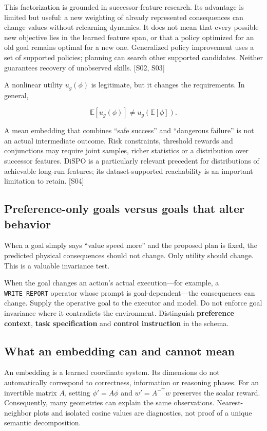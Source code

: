 \documentclass[
  11pt,
  a4paper,
]{article}
\begin{document}
This factorization is grounded in successor-feature research. Its
advantage is limited but useful: a new weighting of already represented
consequences can change values without relearning dynamics. It does not
mean that every possible new objective lies in the learned feature span,
or that a policy optimized for an old goal remains optimal for a new
one. Generalized policy improvement uses a set of supported policies;
planning can search other supported candidates. Neither guarantees
recovery of unobserved skills. {[}S02, S03{]}

A nonlinear utility \(u_g(\phi)\) is legitimate, but it changes the
requirements. In general,

\[
\mathbb{E}[u_g(\phi)]\ne u_g(\mathbb{E}[\phi]).
\]

A mean embedding that combines ``safe success'' and ``dangerous
failure'' is not an actual intermediate outcome. Risk constraints,
threshold rewards and conjunctions may require joint samples, richer
statistics or a distribution over successor features. DiSPO is a
particularly relevant precedent for distributions of achievable long-run
features; its dataset-supported reachability is an important limitation
to retain. {[}S04{]}

\subsection{Preference-only goals versus goals that alter
behavior}\label{preference-only-goals-versus-goals-that-alter-behavior}

When a goal simply says ``value speed more'' and the proposed plan is
fixed, the predicted physical consequences should not change. Only
utility should change. This is a valuable invariance test.

When the goal changes an action's actual execution---for example, a
\texttt{WRITE\_REPORT} operator whose prompt is goal-dependent---the
consequences can change. Supply the operative goal to the executor and
model. Do not enforce goal invariance where it contradicts the
environment. Distinguish \textbf{preference context}, \textbf{task
specification} and \textbf{control instruction} in the schema.

\subsection{What an embedding can and cannot
mean}\label{what-an-embedding-can-and-cannot-mean}

An embedding is a learned coordinate system. Its dimensions do not
automatically correspond to correctness, information or reasoning
phases. For an invertible matrix \(A\), setting \(\phi'=A\phi\) and
\(w'=A^{-\top}w\) preserves the scalar reward. Consequently, many
geometries can explain the same observations. Nearest-neighbor plots and
isolated cosine values are diagnostics, not proof of a unique semantic
decomposition.
\end{document}
